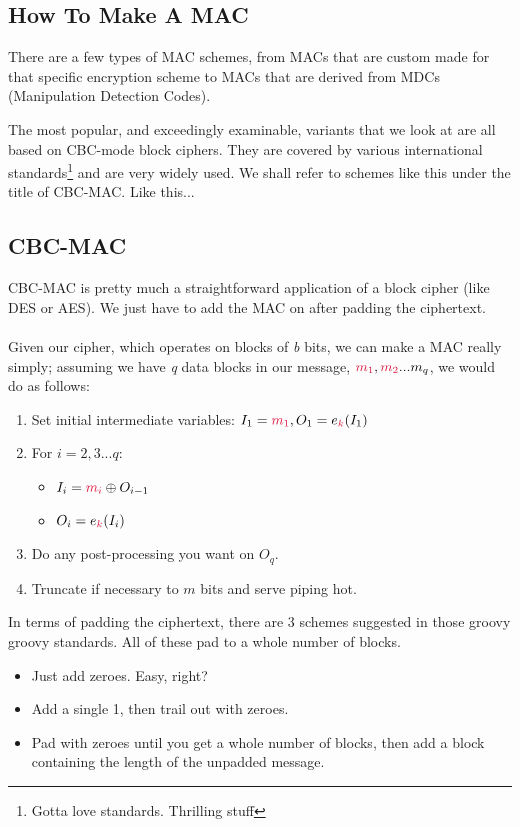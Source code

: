     \subsection{How To Make A MAC}
    There are a few types of MAC schemes, from MACs that are custom made for that specific encryption scheme to MACs that are derived from MDCs (Manipulation Detection Codes).

    The most popular, and exceedingly examinable, variants that we look at are all based on CBC-mode block ciphers. They are covered by various international standards\footnote{Gotta love standards. Thrilling stuff} and are very widely used. We shall refer to schemes like this under the title of CBC-MAC. Like this...

    \subsection{CBC-MAC}
    CBC-MAC is pretty much a straightforward application of a block cipher (like DES or AES). We just have to add the MAC on after padding the ciphertext.\\
    \\
    Given our cipher, which operates on blocks of \emph{b} bits, we can make a MAC really simply; assuming we have \emph{q} data blocks in our message, $\csubm{1}, \csubm{2}...m_{q}$, we would do as follows:\\

    \begin{enumerate}
        \item Set initial intermediate variables: $I_{1} = \csubm{1}, O_{1} = e_{\ck}(I_{1})$
        \item For $i = 2, 3 ... q$:
            \begin{itemize}
                \item $I_{i} = \csubm{i} \oplus O_{i - 1}$
                \item $O_{i} = e_{\ck}(I_{i})$
            \end{itemize}
        \item Do any post-processing you want on $O_{q}$.
        \item Truncate if necessary to $m$ bits and serve piping hot.
    \end{enumerate}

    In terms of padding the ciphertext, there are 3 schemes suggested in those groovy groovy standards. All of these pad to a whole number of blocks.
    \begin{itemize}
        \item Just add zeroes. Easy, right?
        \item Add a single 1, then trail out with zeroes.
        \item Pad with zeroes until you get a whole number of blocks, then add a block containing the length of the unpadded message.
    \end{itemize}

